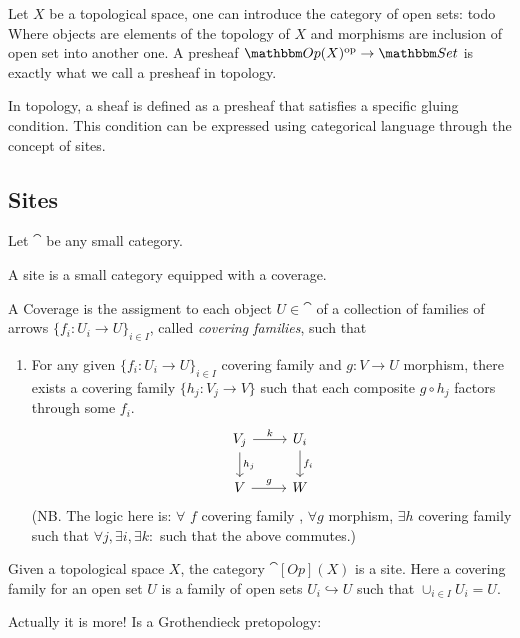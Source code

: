 \documentclass[a4paper,11pt]{article}  %
\begin{document}
\begin{example}\label{ex:topolo-presheaf}
Let $X$ be a topological space, one can introduce the category of open sets:
%
	{todo}
%
Where objects are elements of the topology of $X$ and morphisms are inclusion of open set into another one.
A presheaf $\cat[Op](X)^\op \to \Set$ is exactly what we call a presheaf in topology.
\end{example}
In topology, a sheaf is defined as a presheaf that satisfies a specific gluing condition. This condition can be expressed using categorical language through the concept of sites.


\subsection{Sites}
%
Let $\cat$ be any small category.

\begin{definition}[Site]
	A site is a small category equipped with a coverage.
\end{definition}

\begin{definition}[Coverage]
	A Coverage is the assigment to each object $U \in \cat$ of a collection of families of arrows $\{f_i:U_i\to U\}_{i\in I}$, called \emph{covering families}, such that
\begin{enumerate}
	\item For any given $\{f_i:U_i\to U\}_{i\in I}$ covering family and $g:V\to U$ morphism, there exists a covering family $\{h_j:V_j\to V\}$ such that each composite $g \circ h_j$ factors through some $f_i$.
	\begin{displaymath}
		\begin{tikzcd}
		V_j \ar[r,"k"] \ar[d,"h_j"] & U_i \ar[d,"f_i"] \\
		V \ar[r,"g"] & W
		\end{tikzcd}
	\end{displaymath}
	(NB. The logic here is: $\forall$ $f$ covering family , $\forall g$ morphism, $\exists h$ covering family such that $ \forall j, \exists i, \exists k \colon$ such that the above commutes.)
\end{enumerate}
\end{definition}

\begin{example}
	Given a topological space $X$, the category $\cat[Op](X)$ is a site.
	Here a covering family for an open set $U$ is a family of open sets $U_i \hookrightarrow U$ such that $\cup_{i\in I}U_i = U$. 
\end{example}
Actually it is more! Is a Grothendieck pretopology:
\end{document}
